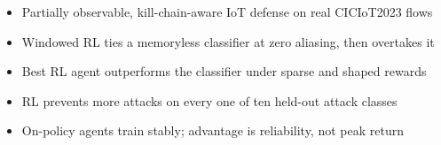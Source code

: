 \begin{itemize}
\item Partially observable, kill-chain-aware IoT defense on real CICIoT2023 flows %
\item Windowed RL ties a memoryless classifier at zero aliasing, then overtakes it %
\item Best RL agent outperforms the classifier under sparse and shaped rewards %
\item RL prevents more attacks on every one of ten held-out attack classes %
\item On-policy agents train stably; advantage is reliability, not peak return %
\end{itemize}
